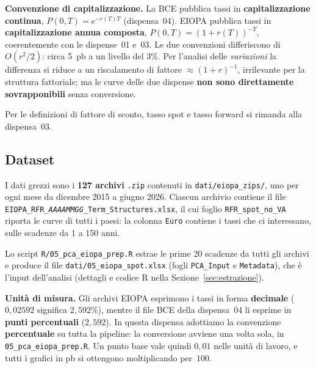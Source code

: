 \documentclass[11pt,a4paper]{article}
\theoremstyle{plain}
\theoremstyle{definition}
\theoremstyle{remark}
\begin{document}
\begin{warningbox}
\textbf{Convenzione di capitalizzazione.}
La BCE pubblica tassi in \textbf{capitalizzazione continua},
$P(0,T)=e^{-r(T)T}$ (dispensa~04). EIOPA pubblica tassi in
\textbf{capitalizzazione annua composta}, $P(0,T)=(1+r(T))^{-T}$,
coerentemente con le dispense~01 e~03. Le due convenzioni differiscono di
$O(r^2/2)$: circa 5~pb a un livello del $3\%$. Per l'analisi delle
\emph{variazioni} la differenza si riduce a un riscalamento di fattore
$\approx(1+r)^{-1}$, irrilevante per la struttura fattoriale; ma le curve
delle due dispense \textbf{non sono direttamente sovrapponibili} senza
conversione.
\end{warningbox}

\noindent Per le definizioni di fattore di sconto, tasso spot e tasso forward si
rimanda alla dispensa~03.

\subsection{Dataset}

I dati grezzi sono i \textbf{127 archivi} \texttt{.zip} contenuti in
\texttt{dati/eiopa\_zips/}, uno per ogni mese da dicembre 2015 a giugno 2026.
Ciascun archivio contiene il file
\texttt{EIOPA\_RFR\_\textit{AAAAMMGG}\_Term\_Structures.xlsx}, il cui foglio
\texttt{RFR\_spot\_no\_VA} riporta le curve di tutti i paesi: la colonna
\texttt{Euro} contiene i tassi che ci interessano, sulle scadenze da 1 a 150
anni.

Lo script \texttt{R/05\_pca\_eiopa\_prep.R} estrae le prime 20 scadenze da tutti
gli archivi e produce il file \texttt{dati/05\_eiopa\_spot.xlsx}
(fogli \texttt{PCA\_Input} e \texttt{Metadata}), che \`e l'input dell'analisi
(dettagli e codice R nella Sezione~\ref{sec:estrazione}).

\begin{warningbox}
\textbf{Unit\`a di misura.}
Gli archivi EIOPA esprimono i tassi in forma \textbf{decimale}
($0{,}02592$ significa $2{,}592\%$), mentre il file BCE della dispensa~04 li
esprime in \textbf{punti percentuali} ($2{,}592$). In questa dispensa adottiamo
la convenzione \textbf{percentuale} su tutta la pipeline: la conversione avviene
una volta sola, in \texttt{05\_pca\_eiopa\_prep.R}. Un punto base vale quindi
$0{,}01$ nelle unit\`a di lavoro, e tutti i grafici in pb si ottengono
moltiplicando per~$100$.
\end{warningbox}

\end{document}
